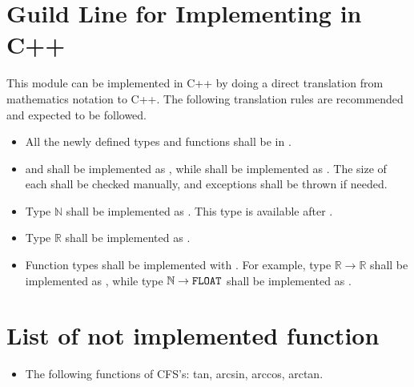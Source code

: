 \documentclass[12pt, titlepage]{article}
\begin{document}
\section{Guild Line for Implementing in C++}\label{Appendix:guildeline}
This module can be implemented in C++ by doing a direct translation from mathematics notation to C++.
The following translation rules are recommended and expected to be followed.
\begin{itemize}
	\item All the newly defined types and functions shall be in .
	\item {} and  shall be implemented as , while  shall be implemented as . The size of each  shall be checked manually, and exceptions shall be thrown if needed.
	\item Type $\mathbb{N}$ shall be implemented as . This type is available after . 
	\item Type $\mathbb{R}$ shall be implemented as .
	\item Function types shall be implemented with . For example, type $\mathbb{R}\rightarrow\mathbb{R}$ shall be implemented as , while type $\mathbb{N}\rightarrow\texttt{FLOAT}$ shall be implemented as . 
\end{itemize}
\section{List of not implemented function}
\begin{itemize}
	\item The following functions of CFS's: tan, arcsin, arccos, arctan.
\end{itemize}
\end{document}
